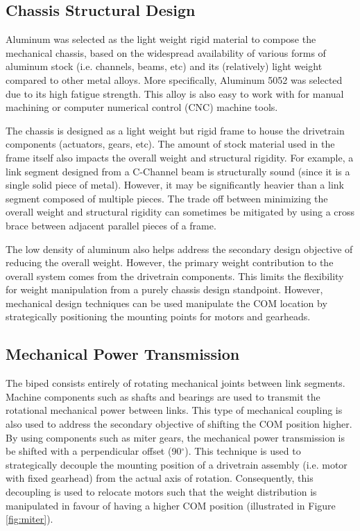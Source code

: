 
\subsection{Chassis Structural Design} %
\label{sub:structural_design}
Aluminum was selected as the light weight rigid material to compose the mechanical chassis, based on the widespread availability of various forms of aluminum stock (i.e. channels, beams, etc) and its (relatively) light weight compared to other metal alloys. More specifically, Aluminum 5052 was selected due to its high fatigue strength. This alloy is also easy to work with for manual machining or computer numerical control (CNC) machine tools. 

The chassis is designed as a light weight but rigid frame to house the drivetrain components (actuators, gears, etc). The amount of stock material used in the frame itself also impacts the overall weight and structural rigidity. For example, a link segment designed from a C-Channel beam is structurally sound (since it is a single solid piece of metal). However, it may be significantly heavier than a link segment composed of multiple pieces. The trade off between minimizing the overall weight and structural rigidity can sometimes be mitigated by using a cross brace between adjacent parallel pieces of a frame.  

The low density of aluminum also helps address the secondary design objective of reducing the overall weight. However, the primary weight contribution to the overall system comes from the drivetrain components. This limits the flexibility for weight manipulation from a purely chassis design standpoint. However, mechanical design techniques can be used manipulate the COM location by strategically positioning the mounting points for motors and gearheads. 

\subsection{Mechanical Power Transmission} %
\label{sub:mechanical_power_transmission}
The biped consists entirely of rotating mechanical joints between link segments. Machine components such as shafts and bearings are used to transmit the rotational mechanical power between links. This type of mechanical coupling is also used to address the secondary objective of shifting the COM position higher. By using components such as miter gears, the mechanical power transmission is be shifted with a perpendicular offset (90$^\circ$). This technique is used to strategically decouple the mounting position of a drivetrain assembly (i.e. motor with fixed gearhead) from the actual axis of rotation. Consequently, this decoupling is used to relocate motors such that the weight distribution is manipulated in favour of having a higher COM position (illustrated in Figure \ref{fig:miter}).
	
